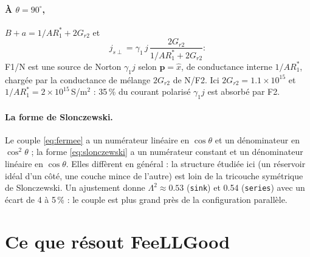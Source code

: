 \documentclass[11pt,a4paper]{article}
\newcommand{\vp}{\bm{p}}
\begin{document}
\paragraph{À $\theta = 90^\circ$,} $B + a = 1/AR_1^* + 2G_{r2}$ et
\begin{equation}
  j_{s\perp} = \gamma_1\,j\,\frac{2G_{r2}}{1/AR_1^* + 2G_{r2}} :
\end{equation}
F1/N est une source de Norton $\gamma_1j$ selon $\vp = \hat x$, de
conductance interne $1/AR_1^*$, chargée par la conductance de mélange
$2G_{r2}$ de N/F2. Ici $2G_{r2} = 1.1\times10^{15}$ et $1/AR_1^* =
2\times10^{15}$\,S/m$^2$ : 35\,\% du courant polarisé $\gamma_1 j$ est
absorbé par F2.

\paragraph{La forme de Slonczewski.} Le couple \eqref{eq:fermee} a un
numérateur linéaire en $\cos\theta$ et un dénominateur en $\cos^2\theta$ ;
la forme \eqref{eq:slonczewski} a un numérateur constant et un
dénominateur linéaire en $\cos\theta$. Elles diffèrent en général : la
structure étudiée ici (un réservoir idéal d'un côté, une couche mince de
l'autre) est loin de la tricouche symétrique de Slonczewski. Un ajustement
donne $\Lambda^2 \approx 0.53$ (\texttt{sink}) et 0.54 (\texttt{series})
avec un écart de 4 à 5\,\% : le couple est plus grand près de la
configuration parallèle.

\section{Ce que résout FeeLLGood}
\label{sec:feellgood}
\end{document}
